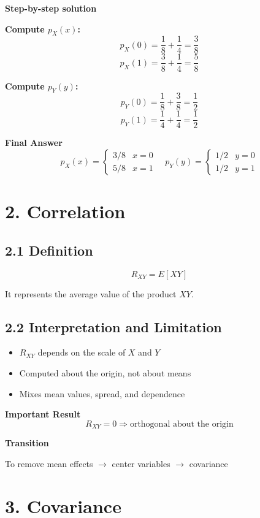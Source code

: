 \documentclass[12pt]{article}
\begin{document}
\textbf{Step-by-step solution}

\textbf{Compute $p_X(x)$:}
\[
p_X(0) = \frac{1}{8} + \frac{1}{4} = \frac{3}{8}
\]
\[
p_X(1) = \frac{3}{8} + \frac{1}{4} = \frac{5}{8}
\]

\textbf{Compute $p_Y(y)$:}
\[
p_Y(0) = \frac{1}{8} + \frac{3}{8} = \frac{1}{2}
\]
\[
p_Y(1) = \frac{1}{4} + \frac{1}{4} = \frac{1}{2}
\]

\textbf{Final Answer}
\[
p_X(x) =
\begin{cases}
3/8 & x=0 \\
5/8 & x=1
\end{cases}
\quad
p_Y(y) =
\begin{cases}
1/2 & y=0 \\
1/2 & y=1
\end{cases}
\]

\section*{2. Correlation}

\subsection*{2.1 Definition}

\[
R_{XY} = E[XY]
\]

It represents the average value of the product $XY$.

\subsection*{2.2 Interpretation and Limitation}

\begin{itemize}
    \item $R_{XY}$ depends on the scale of $X$ and $Y$
    \item Computed about the origin, not about means
    \item Mixes mean values, spread, and dependence
\end{itemize}

\textbf{Important Result}
\[
R_{XY} = 0 \Rightarrow \text{orthogonal about the origin}
\]

\textbf{Transition}

To remove mean effects $\rightarrow$ center variables $\rightarrow$ covariance

\section*{3. Covariance}
\end{document}
